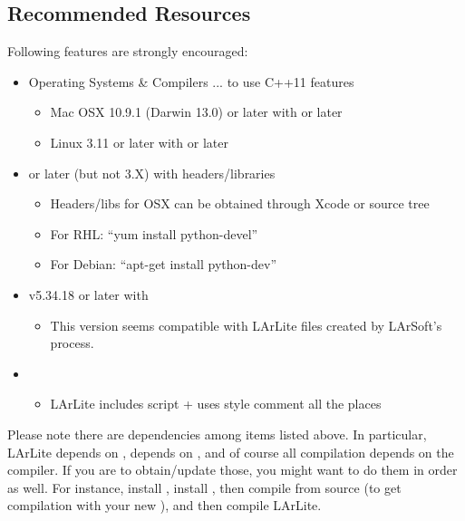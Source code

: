 \subsection{Recommended Resources}
Following features are strongly encouraged:
\begin{itemize}
    \item Operating Systems \& Compilers ... to use {\ttfamily C++11} features
      \begin{itemize}
          \item Mac OSX 10.9.1 (Darwin 13.0) or later with  or later
          \item Linux 3.11 or later with  or later
      \end{itemize}

    \item {} or later (but not 3.X) with headers/libraries
      \begin{itemize}
          \item Headers/libs for OSX can be obtained through Xcode or source tree
          \item For RHL: ``{\ttfamily yum install python-devel}'' 
          \item For Debian: ``{\ttfamily apt-get install python-dev}''
      \end{itemize}

    \item \ROOT v5.34.18 or later with \PyROOT
      \begin{itemize}
          \item This version seems compatible with LArLite files created by LArSoft's \ROOT process.
      \end{itemize}

    \item \doxygen
      \begin{itemize}
          \item LArLite includes \doxygen script + uses \doxygen style comment all the places
      \end{itemize}

\end{itemize}

Please note there are dependencies among items listed above.
In particular, LArLite depends on \ROOT, \PyROOT depends on \python, and of course all compilation depends on the compiler.
If you are to obtain/update those, you might want to do them in order as well. For instance, install \clang, install , then compile \ROOT from source (to get \PyROOT compilation with your new \python), and then compile LArLite.

